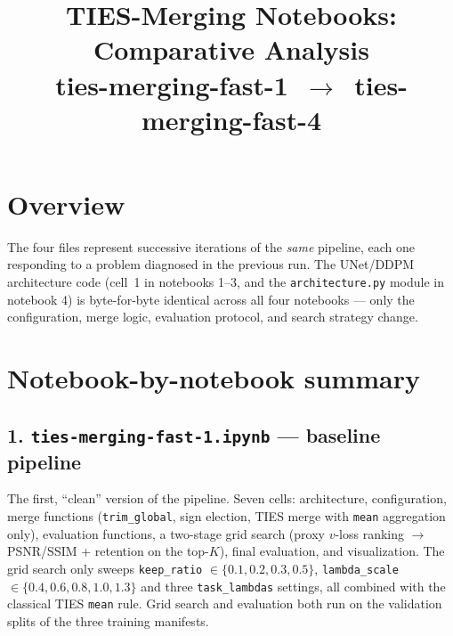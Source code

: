 \documentclass[11pt]{article}
\title{\textbf{TIES-Merging Notebooks: Comparative Analysis}\\
\large ties-merging-fast-1 \,$\to$\, ties-merging-fast-4}
\author{}
\date{}
\begin{document}
\maketitle
\vspace{-1.5em}

\section{Overview}

The four files represent successive iterations of the \emph{same} pipeline,
each one responding to a problem diagnosed in the previous run. The
UNet/DDPM architecture code (cell~1 in notebooks 1--3, and the
\texttt{architecture.py} module in notebook 4) is byte-for-byte identical
across all four notebooks — only the configuration, merge logic, evaluation
protocol, and search strategy change.

\section{Notebook-by-notebook summary}

\subsection*{1. \texttt{ties-merging-fast-1.ipynb} --- baseline pipeline}
The first, ``clean'' version of the pipeline. Seven cells: architecture,
configuration, merge functions (\texttt{trim\_global}, sign election, TIES
merge with \texttt{mean} aggregation only), evaluation functions, a two-stage
grid search (proxy $v$-loss ranking $\to$ PSNR/SSIM + retention on the
top-$K$), final evaluation, and visualization. The grid search only sweeps
\texttt{keep\_ratio} $\in\{0.1,0.2,0.3,0.5\}$, \texttt{lambda\_scale}
$\in\{0.4,0.6,0.8,1.0,1.3\}$ and three \texttt{task\_lambdas} settings, all
combined with the classical TIES \texttt{mean} rule. Grid search and
evaluation both run on the validation splits of the three training
manifests.
\end{document}
